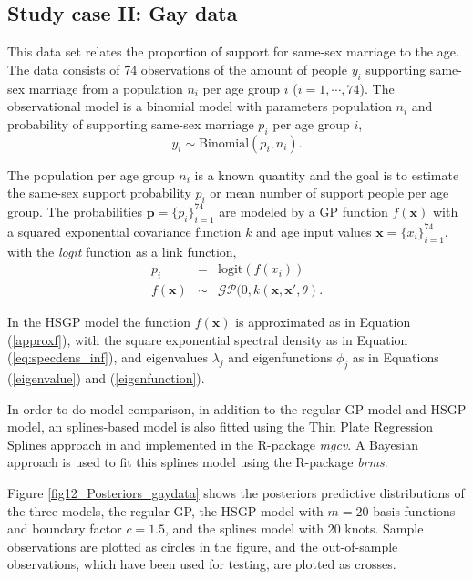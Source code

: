 \documentclass[]{interact}
\theoremstyle{plain}%
\theoremstyle{definition}
\theoremstyle{remark}
\begin{document}
\subsection{Study case II: Gay data}
This data set relates the proportion of support for same-sex marriage to the age. The data consists of 74 observations of the amount of people $y_i$ supporting same-sex marriage from a population $n_i$ per age group $i$ ($i=1,\cdots,74$). The observational model is a binomial model with parameters population $n_i$ and probability of supporting same-sex marriage $p_i$ per age group $i$,
%
\begin{equation*}
y_i \sim \text{Binomial}(p_i, n_i).
\end{equation*}

\noindent The population per age group $n_i$ is a known quantity and the goal is to estimate the same-sex support probability $p_i$ or mean number of support people per age group. The probabilities $\bm{p}=\{p_i\}_{i=1}^{74}$ are modeled by a GP function $f(\bm{x})$ with a squared exponential covariance function $k$ and age input values $\bm{x}=\{x_i\}_{i=1}^{74}$, with the {\it logit} function as a link function,
%
\begin{eqnarray*} \label{eq:gpprior_gay}
p_i &=& \text{logit}(f(x_i)) \nonumber \\
f(\bm{x}) &\sim& \mathcal{GP}(0, k(\bm{x},\bm{x}', \theta).
\end{eqnarray*}

In the HSGP model the function $f(\bm{x})$ is approximated as in Equation (\ref{approxf}), with the square exponential spectral density as in Equation (\ref{eq:specdens_inf}), and eigenvalues $\lambda_j$  and eigenfunctions $\phi_j$ as in Equations (\ref{eigenvalue}) and (\ref{eigenfunction}). 

In order to do model comparison, in addition to the regular GP model and HSGP model, an splines-based model is also fitted using the Thin Plate Regression Splines approach in \cite{wood2003thin} and implemented in the R-package \textit{mgcv}. A Bayesian approach is used to fit this splines model using the R-package \textit{brms}.

Figure \ref{fig12_Posteriors_gaydata} shows the posteriors predictive distributions of the three models, the regular GP, the HSGP model with $m=20$ basis functions and boundary factor $c=1.5$, and the splines model with 20 knots. Sample observations are plotted as circles in the figure, and the out-of-sample observations, which have been used for testing, are plotted as crosses.
\end{document}
